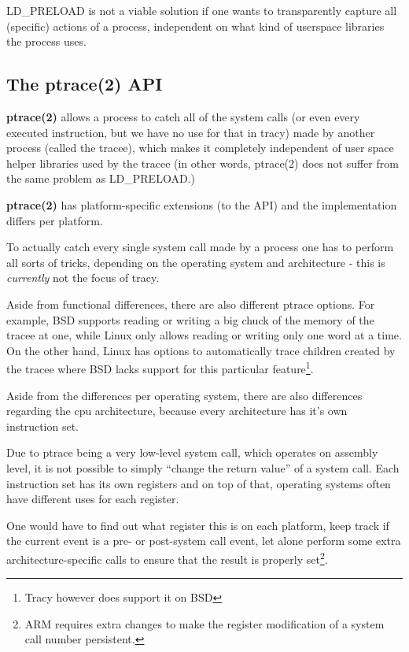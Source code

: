 \documentclass[a4paper, twoside, 10pt, twocolumn]{report}
\begin{document}
LD\_PRELOAD is not a viable solution if one wants to transparently capture all
(specific) actions of a process, independent on what kind of userspace libraries
the process uses.

\subsection{The ptrace(2) API}

\textbf{ptrace(2)} allows a process to catch all of the system calls (or even
every executed instruction, but we have no use for that in tracy)
made by another process (called the tracee), which makes it completely
independent of user space helper libraries used by the tracee (in other words,
ptrace(2) does not suffer from the same problem as LD\_PRELOAD.)

\textbf{ptrace(2)} has platform-specific extensions (to the API) and the
implementation differs per platform.

To actually catch every single system call made by a process one has to
perform all sorts of tricks\cite{}, depending on the operating system and
architecture - this is \textit{currently} not the focus of tracy.

Aside from functional differences, there are also different ptrace options.
For example, BSD supports reading or writing a big chuck of the memory
of the tracee at one, while Linux only allows reading or writing only one
word at a time. On the other hand, Linux has options to automatically trace
children created by the tracee where BSD lacks support for
this particular feature\footnote{Tracy however does support it on BSD}.

Aside from the differences per operating system, there are also differences
regarding the cpu architecture, because every architecture has it's own
instruction set.

Due to ptrace being a very low-level system call, which operates on assembly
level, it is not possible to simply ``change the return value'' of a system
call. Each instruction set has its own registers and on top of that, operating
systems often have different uses for each register.


One would have to find out what register this is on each platform,
keep track if the current event is a pre- or post-system call event, let alone
perform some extra architecture-specific calls to ensure that the result is
properly set\footnote{ARM requires extra changes to make the register
modification of a system call number persistent.}.
\end{document}
